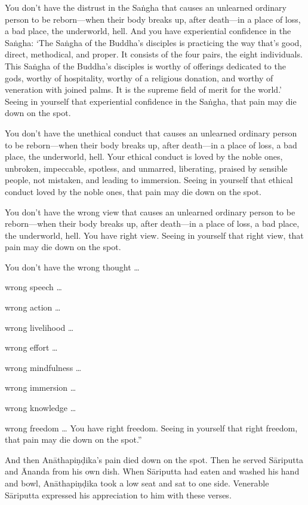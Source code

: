 \documentclass[12pt,openany]{book}%
\begin{document}
You don’t have the distrust in the \textsanskrit{Saṅgha} that causes an unlearned ordinary person to be reborn—when their body breaks up, after death—in a place of loss, a bad place, the underworld, hell. And you have experiential confidence in the \textsanskrit{Saṅgha}: ‘The \textsanskrit{Saṅgha} of the Buddha’s disciples is practicing the way that’s good, direct, methodical, and proper. It consists of the four pairs, the eight individuals. This \textsanskrit{Saṅgha} of the Buddha’s disciples is worthy of offerings dedicated to the gods, worthy of hospitality, worthy of a religious donation, and worthy of veneration with joined palms. It is the supreme field of merit for the world.’ Seeing in yourself that experiential confidence in the \textsanskrit{Saṅgha}, that pain may die down on the spot. 

You don’t have the unethical conduct that causes an unlearned ordinary person to be reborn—when their body breaks up, after death—in a place of loss, a bad place, the underworld, hell. Your ethical conduct is loved by the noble ones, unbroken, impeccable, spotless, and unmarred, liberating, praised by sensible people, not mistaken, and leading to immersion. Seeing in yourself that ethical conduct loved by the noble ones, that pain may die down on the spot. 

You don’t have the wrong view that causes an unlearned ordinary person to be reborn—when their body breaks up, after death—in a place of loss, a bad place, the underworld, hell. You have right view. Seeing in yourself that right view, that pain may die down on the spot. 

You don’t have the wrong thought … 

wrong speech … 

wrong action … 

wrong livelihood … 

wrong effort … 

wrong mindfulness … 

wrong immersion … 

wrong knowledge … 

wrong freedom … You have right freedom. Seeing in yourself that right freedom, that pain may die down on the spot.” 

And then \textsanskrit{Anāthapiṇḍika}’s pain died down on the spot. Then he served \textsanskrit{Sāriputta} and Ānanda from his own dish. When \textsanskrit{Sāriputta} had eaten and washed his hand and bowl, \textsanskrit{Anāthapiṇḍika} took a low seat and sat to one side. Venerable \textsanskrit{Sāriputta} expressed his appreciation to him with these verses. 
\end{document}
